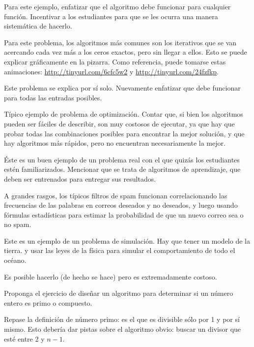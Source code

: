 \documentclass[10pt]{article}
\begin{document}

  Para este ejemplo,
  enfatizar que el algoritmo debe funcionar para cualquier función.
  Incentivar a los estudiantes para que se les ocurra
  una manera sistemática de hacerlo.
  
  Para este problema,
  los algoritmos más comunes son los iterativos
  que se van acercando cada vez más a los ceros exactos,
  pero sin llegar a ellos.
  Esto se puede explicar gráficamente en la pizarra.
  Como referencia, puede tomarse estas animaciones:
  \url{http://tinyurl.com/6cfc5w2} y
  \url{http://tinyurl.com/24fzfkp}.


  Este problema se explica por sí solo.
  Nuevamente enfatizar que debe funcionar para todas las entradas posibles.


  Típico ejemplo de problema de optimización.
  Contar que, si bien los algoritmos pueden ser fáciles de describir,
  son muy costosos de ejecutar,
  ya que hay que probar todas las combinaciones posibles
  para encontrar la mejor solución,
  y que hay algoritmos más rápidos,
  pero no encuentran necesariamente la mejor.


  Éste es un buen ejemplo de un problema real
  con el que quizás los estudiantes estén familiarizados.
  Mencionar que se trata de algoritmos de aprendizaje,
  que deben ser entrenados para entregar sus resultados.
  
  A grandes rasgos,
  los típicos filtros de spam
  funcionan correlacionando las frecuencias de las palabras
  en correos deseados y no deseados,
  y luego usando fórmulas estadísticas
  para estimar la probabilidad de que un nuevo correo sea o no spam.


  Este es un ejemplo de un problema de simulación.
  Hay que tener un modelo de la tierra.
  y usar las leyes de la física
  para simular el comportamiento de todo el océano.

  Es posible hacerlo (de hecho se hace)
  pero es extremadamente costoso.


  Proponga el ejercicio de diseñar un algoritmo
  para determinar si un número entero es primo o compuesto.

  Repase la definición de número primo:
  es el que es divisible sólo por 1 y por sí mismo.
  Esto debería dar pistas sobre el algoritmo obvio:
  buscar un divisor que esté entre 2 y \(n - 1\).
\end{document}
